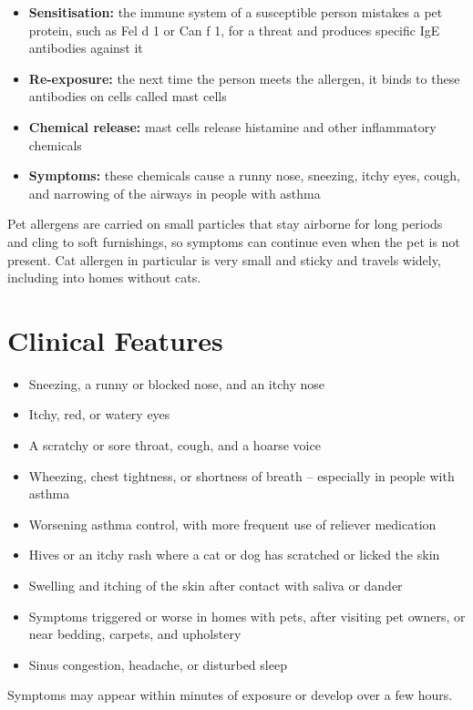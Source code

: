 \begin{itemize}
    \item \textbf{Sensitisation:} the immune system of a susceptible person mistakes a pet protein, such as Fel d 1 or Can f 1, for a threat and produces specific IgE antibodies against it
    \item \textbf{Re-exposure:} the next time the person meets the allergen, it binds to these antibodies on cells called mast cells
    \item \textbf{Chemical release:} mast cells release histamine and other inflammatory chemicals
    \item \textbf{Symptoms:} these chemicals cause a runny nose, sneezing, itchy eyes, cough, and narrowing of the airways in people with asthma
\end{itemize}

Pet allergens are carried on small particles that stay airborne for long periods and cling to soft furnishings, so symptoms can continue even when the pet is not present. Cat allergen in particular is very small and sticky and travels widely, including into homes without cats.

\section*{Clinical Features}
\begin{itemize}
    \item Sneezing, a runny or blocked nose, and an itchy nose
    \item Itchy, red, or watery eyes
    \item A scratchy or sore throat, cough, and a hoarse voice
    \item Wheezing, chest tightness, or shortness of breath -- especially in people with asthma
    \item Worsening asthma control, with more frequent use of reliever medication
    \item Hives or an itchy rash where a cat or dog has scratched or licked the skin
    \item Swelling and itching of the skin after contact with saliva or dander
    \item Symptoms triggered or worse in homes with pets, after visiting pet owners, or near bedding, carpets, and upholstery
    \item Sinus congestion, headache, or disturbed sleep
\end{itemize}

Symptoms may appear within minutes of exposure or develop over a few hours.

